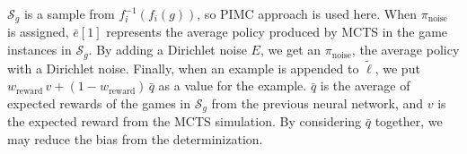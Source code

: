 \documentclass[10pt,twocolumn,letterpaper]{article}
\begin{document}
$\mathcal S_g$ is a sample from $f_i^{-1}(f_i(g))$, so PIMC approach is used here. When $\pi_\text{noise}$ is assigned, $\bar e[1]$ represents the average policy produced by MCTS in the game instances in $\mathcal S_g$. By adding a Dirichlet noise $E$, we get an $\pi_\textrm{noise}$, the average policy with a Dirichlet noise. Finally, when an example is appended to $\tilde\ell$, we put $w_\text{reward}\,v + (1 - w_\text{reward})\,\bar q$ as a value for the example. $\bar q$ is the average of expected rewards of the games in $\mathcal S_g$ from the previous neural network, and $v$ is the expected reward from the MCTS simulation. By considering $\bar q$ together, we may reduce the bias from the determinization.

\begin{algorithm}
\small
{}
\SetAlgoLined
{}
\end{algorithm}
\end{document}
